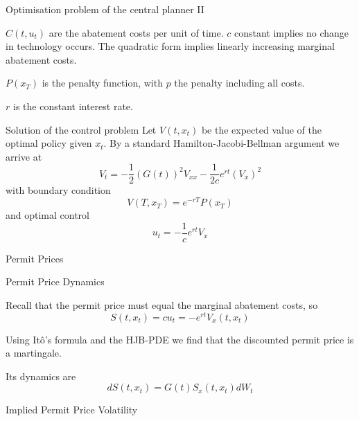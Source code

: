 {Optimisation problem of the central planner II}


	$C(t,u_t)$ are the abatement costs per unit of time. $c$ constant implies no change in technology occurs.
The quadratic form implies linearly increasing marginal abatement costs.

	$P(x_T)$ is the penalty function, with $p$ the penalty including all costs.

	$r$ is the constant interest rate.


{Solution of the control problem}
Let $V(t,x_t)$ be the expected value of the optimal policy given $x_t$. By a standard
Hamilton-Jacobi-Bellman argument we arrive at
\begin{equation}
V_t=-\frac{1}{2}(G(t))^2 V_{xx}-\frac{1}{2c}e^{rt}(V_x)^2
\end{equation}
with boundary condition
$$
V(T, x_T)=e^{-rT}P(x_T)
$$
and optimal control
$$
u_t=-\frac{1}{c} e^{rt}V_x
$$

{Permit Prices}
\begin{center}
\begin{figure}[h!]
\centering
{}

\end{figure}
\end{center}

{Permit Price Dynamics}


	Recall that the permit price must equal the marginal abatement costs, so
\begin{equation}
S(t,x_t) = c u_t = -e^{rt} V_x(t,x_t)
\end{equation}

	Using It{\^o}'s formula and the HJB-PDE we find that the discounted permit price is a martingale.

	Its dynamics are
\begin{equation}
dS(t,x_t)= G(t)S_x(t,x_t) dW_t
\end{equation}


{Implied Permit Price Volatility}
\begin{center}
\begin{figure}[h!]
\centering
{}

\end{figure}
\end{center}

